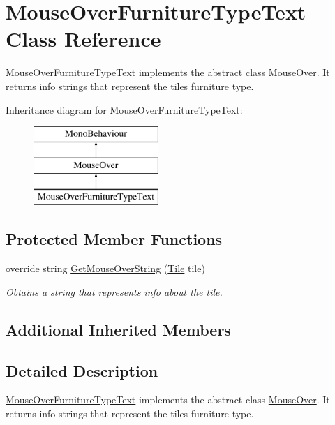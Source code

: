\hypertarget{class_mouse_over_furniture_type_text}{}\section{Mouse\+Over\+Furniture\+Type\+Text Class Reference}
\label{class_mouse_over_furniture_type_text}


\hyperlink{class_mouse_over_furniture_type_text}{Mouse\+Over\+Furniture\+Type\+Text} implements the abstract class \hyperlink{class_mouse_over}{Mouse\+Over}. It returns info strings that represent the tiles furniture type.  


Inheritance diagram for Mouse\+Over\+Furniture\+Type\+Text\+:\begin{figure}[H]
\begin{center}
\leavevmode
\includegraphics[height=3.000000cm]{class_mouse_over_furniture_type_text}
\end{center}
\end{figure}
\subsection*{Protected Member Functions}
\begin{DoxyCompactItemize}
\item 
override string \hyperlink{class_mouse_over_furniture_type_text_a651f612de5c73264437f9109e1f7229c}{Get\+Mouse\+Over\+String} (\hyperlink{class_tile}{Tile} tile)
\begin{DoxyCompactList}\small\item\em Obtains a string that represents info about the tile. \end{DoxyCompactList}\end{DoxyCompactItemize}
\subsection*{Additional Inherited Members}


\subsection{Detailed Description}
\hyperlink{class_mouse_over_furniture_type_text}{Mouse\+Over\+Furniture\+Type\+Text} implements the abstract class \hyperlink{class_mouse_over}{Mouse\+Over}. It returns info strings that represent the tiles furniture type. 



